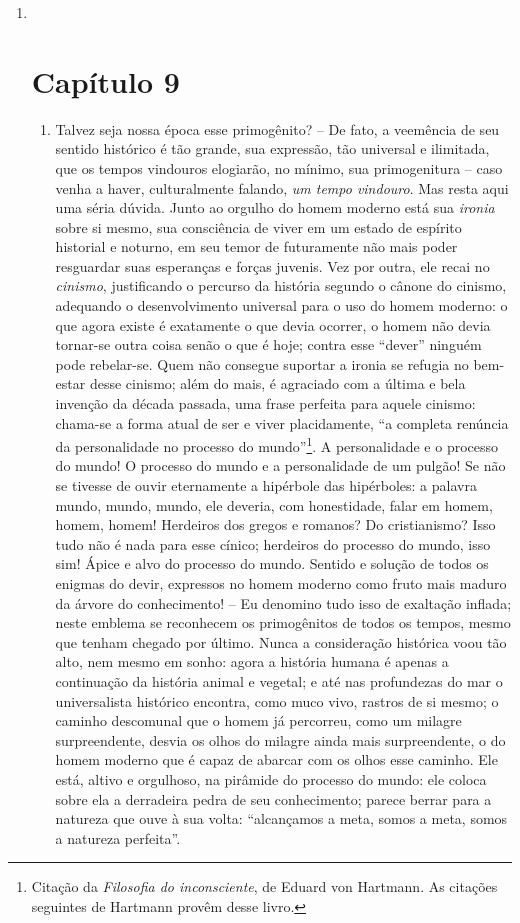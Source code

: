 \begin{enumerate}
\item ~
  \chapter{Capítulo 9}\label{capuxedtulo-9}

  \begin{enumerate}
  \item
    Talvez seja nossa época esse primogênito? -- De fato, a veemência de
    seu sentido histórico é tão grande, sua expressão, tão universal e
    ilimitada, que os tempos vindouros elogiarão, no mínimo, sua
    primogenitura -- caso venha a haver, culturalmente falando, \emph{um
    tempo vindouro}. Mas resta aqui uma séria dúvida. Junto ao orgulho
    do homem moderno está sua \emph{ironia} sobre si mesmo, sua
    consciência de viver em um estado de espírito historial e noturno,
    em seu temor de futuramente não mais poder resguardar suas
    esperanças e forças juvenis. Vez por outra, ele recai no
    \emph{cinismo}, justificando o percurso da história segundo o cânone
    do cinismo, adequando o desenvolvimento universal para o uso do
    homem moderno: o que agora existe é exatamente o que devia ocorrer,
    o homem não devia tornar-se outra coisa senão o que é hoje; contra
    esse ``dever'' ninguém pode rebelar-se. Quem não consegue suportar a
    ironia se refugia no bem-estar desse cinismo; além do mais, é
    agraciado com a última e bela invenção da década passada, uma frase
    perfeita para aquele cinismo: chama-se a forma atual de ser e viver
    placidamente, ``a completa renúncia da personalidade no processo do
    mundo''\footnote{Citação da \emph{Filosofia do inconsciente}, de
      Eduard von Hartmann. As citações seguintes de Hartmann provêm
      desse livro.}. A personalidade e o processo do mundo! O processo
    do mundo e a personalidade de um pulgão! Se não se tivesse de ouvir
    eternamente a hipérbole das hipérboles: a palavra mundo, mundo,
    mundo, ele deveria, com honestidade, falar em homem, homem, homem!
    Herdeiros dos gregos e romanos? Do cristianismo? Isso tudo não é
    nada para esse cínico; herdeiros do processo do mundo, isso sim!
    Ápice e alvo do processo do mundo. Sentido e solução de todos os
    enigmas do devir, expressos no homem moderno como fruto mais maduro
    da árvore do conhecimento! -- Eu denomino tudo isso de exaltação
    inflada; neste emblema se reconhecem os primogênitos de todos os
    tempos, mesmo que tenham chegado por último. Nunca a consideração
    histórica voou tão alto, nem mesmo em sonho: agora a história humana
    é apenas a continuação da história animal e vegetal; e até nas
    profundezas do mar o universalista histórico encontra, como muco
    vivo, rastros de si mesmo; o caminho descomunal que o homem já
    percorreu, como um milagre surpreendente, desvia os olhos do milagre
    ainda mais surpreendente, o do homem moderno que é capaz de abarcar
    com os olhos esse caminho. Ele está, altivo e orgulhoso, na pirâmide
    do processo do mundo: ele coloca sobre ela a derradeira pedra de seu
    conhecimento; parece berrar para a natureza que ouve à sua volta:
    ``alcançamos a meta, somos a meta, somos a natureza perfeita''.


\end{enumerate}
\end{enumerate}
